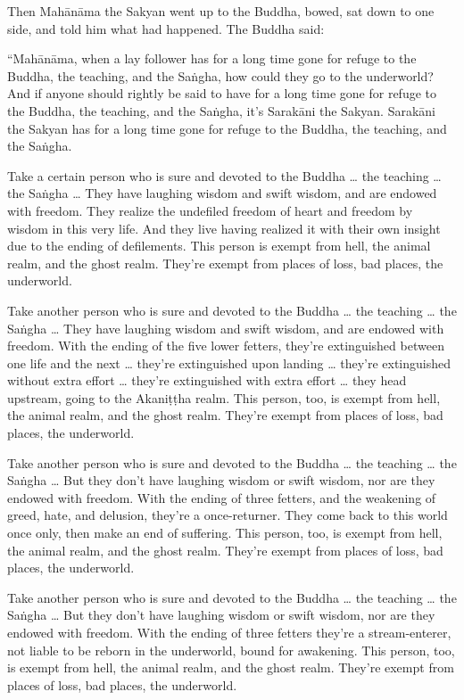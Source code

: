 \documentclass[12pt,openany]{book}%
\begin{document}
Then \textsanskrit{Mahānāma} the Sakyan went up to the Buddha, bowed, sat down to one side, and told him what had happened. The Buddha said: 

“\textsanskrit{Mahānāma}, when a lay follower has for a long time gone for refuge to the Buddha, the teaching, and the \textsanskrit{Saṅgha}, how could they go to the underworld? And if anyone should rightly be said to have for a long time gone for refuge to the Buddha, the teaching, and the \textsanskrit{Saṅgha}, it’s \textsanskrit{Sarakāni} the Sakyan. \textsanskrit{Sarakāni} the Sakyan has for a long time gone for refuge to the Buddha, the teaching, and the \textsanskrit{Saṅgha}. 

Take a certain person who is sure and devoted to the Buddha … the teaching … the \textsanskrit{Saṅgha} … They have laughing wisdom and swift wisdom, and are endowed with freedom. They realize the undefiled freedom of heart and freedom by wisdom in this very life. And they live having realized it with their own insight due to the ending of defilements. This person is exempt from hell, the animal realm, and the ghost realm. They’re exempt from places of loss, bad places, the underworld. 

Take another person who is sure and devoted to the Buddha … the teaching … the \textsanskrit{Saṅgha} … They have laughing wisdom and swift wisdom, and are endowed with freedom. With the ending of the five lower fetters, they’re extinguished between one life and the next … they’re extinguished upon landing … they’re extinguished without extra effort … they’re extinguished with extra effort … they head upstream, going to the \textsanskrit{Akaniṭṭha} realm. This person, too, is exempt from hell, the animal realm, and the ghost realm. They’re exempt from places of loss, bad places, the underworld. 

Take another person who is sure and devoted to the Buddha … the teaching … the \textsanskrit{Saṅgha} … But they don’t have laughing wisdom or swift wisdom, nor are they endowed with freedom. With the ending of three fetters, and the weakening of greed, hate, and delusion, they’re a once-returner. They come back to this world once only, then make an end of suffering. This person, too, is exempt from hell, the animal realm, and the ghost realm. They’re exempt from places of loss, bad places, the underworld. 

Take another person who is sure and devoted to the Buddha … the teaching … the \textsanskrit{Saṅgha} … But they don’t have laughing wisdom or swift wisdom, nor are they endowed with freedom. With the ending of three fetters they’re a stream-enterer, not liable to be reborn in the underworld, bound for awakening. This person, too, is exempt from hell, the animal realm, and the ghost realm. They’re exempt from places of loss, bad places, the underworld. 
\end{document}
